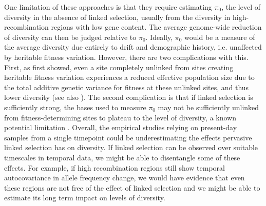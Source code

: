 \documentclass[11pt]{article}
\begin{document}
One limitation of these approaches is that they require estimating $\pi_0$, the
level of diversity in the absence of linked selection, usually from the
diversity in high-recombination regions with low gene content. The average
genome-wide reduction of diversity can then be judged relative to $\pi_0$.
Ideally, $\pi_0$ would be a measure of the average diversity due entirely to
drift and demographic history, i.e. unaffected by heritable fitness variation.
However, there are two complications with this. First, as
\textcite{Robertson1961-ho} first showed, even a site completely unlinked from
sites creating heritable fitness variation experiences a reduced effective
population size due to the total additive genetic variance for fitness at these
unlinked sites, and thus lower diversity (see also \cite{Santiago1995-hx}). The
second complication is that if linked selection is sufficiently strong, the
bases used to measure $\pi_0$ may not be sufficiently unlinked from
fitness-determining sites to plateau to the \textcite{Robertson1961-ho} level
of diversity, a known potential limitation
\parencite{Coop2016-gx,Elyashiv2016-vt}. Overall, the empirical studies relying
on present-day samples from a single timepoint could be underestimating the
effects pervasive linked selection has on diversity. If linked selection can be
observed over suitable timescales in temporal data, we might be able to
disentangle some of these effects. For example, if high recombination regions
still show temporal autocovariance in allele frequency change, we would have
evidence that even these regions are not free of the effect of linked selection
and we might be able to estimate its long term impact on levels of diversity. 
\end{document}
